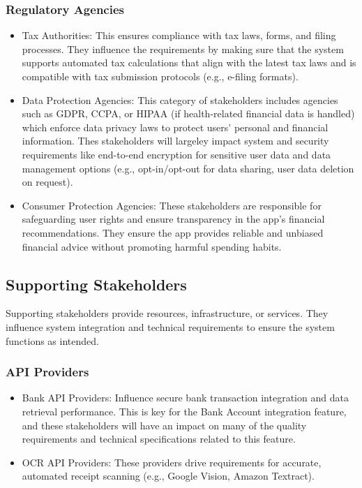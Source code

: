\subsubsection{Regulatory Agencies}
\begin{itemize}
    \item Tax Authorities: This ensures compliance with tax laws, forms, and filing processes. They influence the requirements by making sure that the system supports automated tax calculations that align with the latest tax laws and is compatible with tax submission protocols (e.g., e-filing formats).
    
    \item Data Protection Agencies: This category of stakeholders includes agencies such as GDPR, CCPA, or HIPAA (if health-related financial data is handled) which enforce data privacy laws to protect users' personal and financial information. Thes stakeholders will largeley impact system and security requirements like end-to-end encryption for sensitive user data and data management options (e.g., opt-in/opt-out for data sharing, user data deletion on request).
    
    \item Consumer Protection Agencies: These stakeholders are responsible for safeguarding user rights and ensure transparency in the app’s financial recommendations. They ensure the app provides reliable and unbiased financial advice without promoting harmful spending habits.
\end{itemize}

\subsection{Supporting Stakeholders}
Supporting stakeholders provide resources, infrastructure, or services. They influence system integration and technical requirements to ensure the system functions as intended.

\subsubsection{API Providers}
\begin{itemize}
    \item Bank API Providers: Influence secure bank transaction integration and data retrieval performance. This is key for the Bank Account integration feature, and these stakeholders will have an impact on many of the quality requirements and technical specifications related to this feature.

    \item OCR API Providers: These providers drive requirements for accurate, automated receipt scanning (e.g., Google Vision, Amazon Textract). 
\end{itemize}


